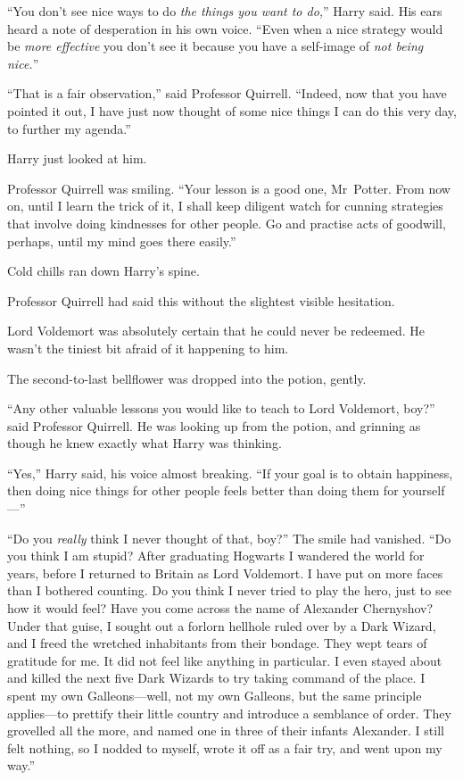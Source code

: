 “You don’t see nice ways to do \emph{the things you want to do,}” Harry said.
His ears heard a note of desperation in his own voice. “Even when a nice
strategy would be \emph{more effective} you don’t see it because you have a
self-image of \emph{not being nice.}”

“That is a fair observation,” said Professor Quirrell. “Indeed, now that you
have pointed it out, I have just now thought of some nice things I can do this
very day, to further my agenda.”

Harry just looked at him.

Professor Quirrell was smiling. “Your lesson is a good one, Mr~Potter. From
now on, until I learn the trick of it, I shall keep diligent watch for cunning
strategies that involve doing kindnesses for other people. Go and practise acts
of goodwill, perhaps, until my mind goes there easily.”

Cold chills ran down Harry’s spine.

Professor Quirrell had said this without the slightest visible hesitation.

Lord Voldemort was absolutely certain that he could never be redeemed. He
wasn’t the tiniest bit afraid of it happening to him.

The second-to-last bellflower was dropped into the potion, gently.

“Any other valuable lessons you would like to teach to Lord Voldemort, boy?”
said Professor Quirrell. He was looking up from the potion, and grinning as
though he knew exactly what Harry was thinking.

“Yes,” Harry said, his voice almost breaking. “If your goal is to obtain
happiness, then doing nice things for other people feels better than doing them
for yourself—”

“Do you \emph{really} think I never thought of that, boy?” The smile had
vanished. “Do you think I am stupid? After graduating Hogwarts I wandered the
world for years, before I returned to Britain as Lord Voldemort. I have put on
more faces than I bothered counting. Do you think I never tried to play the
hero, just to see how it would feel? Have you come across the name of Alexander
Chernyshov? Under that guise, I sought out a forlorn hellhole ruled over by a
Dark Wizard, and I freed the wretched inhabitants from their bondage. They wept
tears of gratitude for me. It did not feel like anything in particular. I even
stayed about and killed the next five Dark Wizards to try taking command of the
place. I spent my own Galleons—well, not my own Galleons, but the same
principle applies—to prettify their little country and introduce a semblance
of order. They grovelled all the more, and named one in three of their infants
Alexander. I still felt nothing, so I nodded to myself, wrote it off as a fair
try, and went upon my way.”

